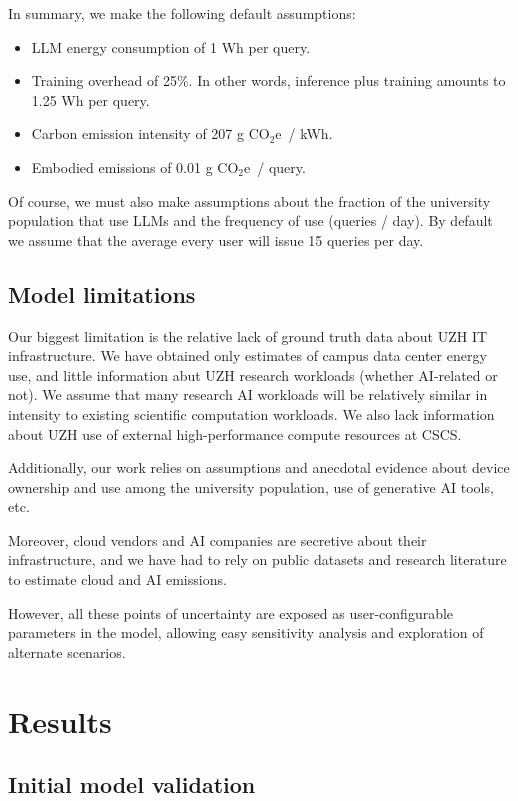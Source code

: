 \documentclass[11pt]{article}
\newcommand{\coe}{CO$_2$e}
\newcommand{\gcoe}{g \coe}
\newcommand{\gcoekwh}{\gcoe\ / kWh}
\begin{document}
In summary, we make the following default assumptions:

\begin{itemize}
  \item LLM energy consumption of 1 Wh per query.
  \item Training overhead of 25\%. In other words, inference plus training amounts to 1.25 Wh per query.
  \item Carbon emission intensity of 207 \gcoekwh.
  \item Embodied emissions of 0.01 \gcoe\ / query.
\end{itemize}

Of course, we must also make assumptions about the fraction of the university population that use LLMs and the frequency of use (queries / day). By default we assume that the average every user will issue 15 queries per day.

\subsection{Model limitations}

Our biggest limitation is the relative lack of ground truth data about UZH IT infrastructure. We have obtained only estimates of campus data center energy use, and little information abut UZH research workloads (whether AI-related or not). We assume that many research AI workloads will be relatively similar in intensity to existing scientific computation workloads. We also lack information about UZH use of external high-performance compute resources at CSCS.

Additionally, our work relies on assumptions and anecdotal evidence about device ownership and use among the university population, use of generative AI tools, etc.

Moreover, cloud vendors and AI companies are secretive about their infrastructure, and we have had to rely on public datasets and research literature to estimate cloud and AI emissions.

However, all these points of uncertainty are exposed as user-configurable parameters in the model, allowing easy sensitivity analysis and exploration of alternate scenarios.

\section{Results}
\label{sec:results}

\subsection{Initial model validation}
\end{document}

